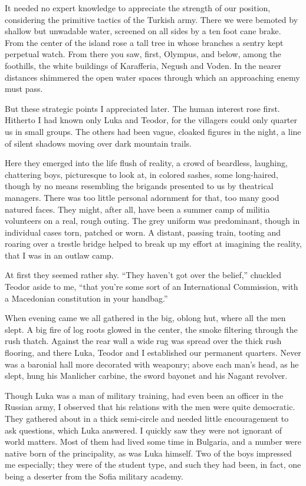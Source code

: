 \documentclass[a5paper,12pt]{book}
\begin{document}
It needed no expert knowledge to appreciate the strength of our position, considering the primitive tactics of the Turkish army. There we were bemoted by shallow but unwadable water, screened on all sides by a ten foot cane brake. From the center of the island rose a tall tree in whose branches a sentry kept perpetual watch. From there you saw, first, Olympus, and below, among the foothills, the white buildings of Karafferia, Negush and Voden. In the nearer distances shimmered the open water spaces through which an approaching enemy must pass. 

But these strategic points I appreciated later. The human interest rose first. Hitherto I had known only Luka and Teodor, for the villagers could only quarter us in small groups. The others had been vague, cloaked figures in the night, a line of silent shadows moving over dark mountain trails. 

Here they emerged into the life flush of reality, a crowd of beardless, laughing, chattering boys, picturesque to look at, in colored sashes, some long-haired, though by no means resembling the brigands presented to us by theatrical managers. There was too little personal adornment for that, too many good natured faces. They might, after all, have been a summer camp of militia volunteers on a real, rough outing. The grey uniform was predominant, though in individual cases torn, patched or worn. A distant, passing train, tooting and roaring over a trestle bridge helped to break up my effort at imagining the reality, that I was in an outlaw camp. 

At first they seemed rather shy. “They haven't got over the belief,” chuckled Teodor aside to me, “that you're some sort of an International Commission, with a Macedonian constitution in your handbag.” 

When evening came we all gathered in the big, oblong hut, where all the men slept. A big fire of log roots glowed in the center, the smoke filtering through the rush thatch. Against the rear wall a wide rug was spread over the thick rush flooring, and there Luka, Teodor and I established our permanent quarters. Never was a baronial hall more decorated with weaponry; above each man’s head, as he slept, hung his Manlicher carbine, the sword bayonet and his Nagant revolver. 

Though Luka was a man of military training, had even been an officer in the Russian army, I observed that his relations with the men were quite democratic. They gathered about in a thick semi-circle and needed little encouragement to ask questions, which Luka answered. I quickly saw they were not ignorant of world matters. Most of them had lived some time in Bulgaria, and a number were native born of the principality, as was Luka himself. Two of the boys impressed me especially; they were of the student type, and such they had been, in fact, one being a deserter from the Sofia military academy. 
\end{document}
